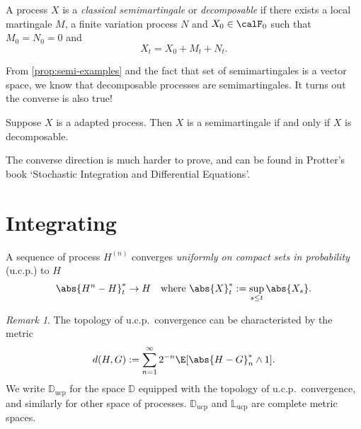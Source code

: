 \documentclass{scrreprt}
\theoremstyle{remark}
\newtheorem{remark}{Remark}
\newcommand{\cadspace}{\mathbb D}
\newcommand{\cagspace}{\mathbb L}
\newcommand{\ucp}{\text{ucp}}
\newcommand\defeq{:=}
\begin{document}
\begin{defn}
	A process $X$ is a \emph{classical semimartingale} or \emph{decomposable} if there exists a local martingale $M$, a finite variation process $N$ and $X_0 \in \calF_0$ such that $M_0 = N_0 = 0$ and
	\begin{equation}
		X_t = X_0 + M_t + N_t.
	\end{equation}
\end{defn}

From \vref{prop:semi-examples} and the fact that set of semimartingales is a vector space, we know that decomposable processes are semimartingales. It turns out the converse is also true!

\begin{prop}
	Suppose $X$ is a \cadlag{} adapted process. Then $X$ is a semimartingale if and only if $X$ is decomposable.
\end{prop}

The converse direction is much harder to prove, and can be found in Protter's book `Stochastic Integration and Differential Equations'.

\section{Integrating}

\begin{defn}
	A sequence of process $H^{(n)}$ converges \emph{uniformly on compact sets in probability} (u.c.p.) to $H$
	\begin{equation}
		\abs{H^n - H}^*_t \to H \quad \text{where}\ \abs{X}^*_t \defeq \sup_{s \leq t} \abs{X_s}.
	\end{equation}
\end{defn}
\begin{remark}
	The topology of u.c.p.\ convergence can be characteristed by the metric
	\begin{equation}
		d(H, G) \defeq \sum_{n=1}^{\infty} 2^{-n} \E[\abs{H - G}_n^* \wedge 1].
	\end{equation}
	We write $\cadspace_{\ucp}$ for the space $\cadspace$ equipped with the topology of u.c.p.\ convergence, and similarly for other space of processes. $\cadspace_{\ucp}$ and $\cagspace_{\ucp}$ are complete metric spaces.
\end{remark}
\end{document}
